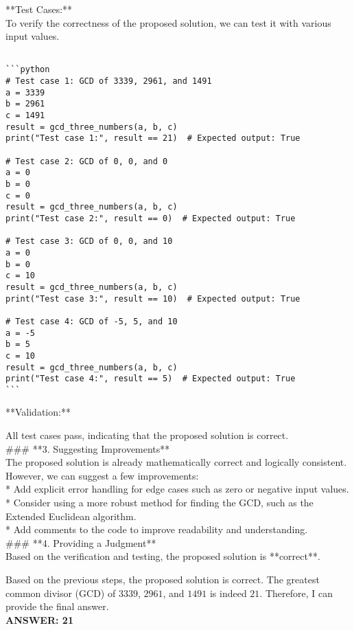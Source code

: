 \begin{tcolorbox}[colback=lightblue, colframe=black, arc=2pt, breakable, title=Examine Answer Tool]
**Test Cases:**\\

To verify the correctness of the proposed solution, we can test it with various input values.\\
\begin{lstlisting}[style=pythonstyle]

```python
# Test case 1: GCD of 3339, 2961, and 1491
a = 3339
b = 2961
c = 1491
result = gcd_three_numbers(a, b, c)
print("Test case 1:", result == 21)  # Expected output: True

# Test case 2: GCD of 0, 0, and 0
a = 0
b = 0
c = 0
result = gcd_three_numbers(a, b, c)
print("Test case 2:", result == 0)  # Expected output: True

# Test case 3: GCD of 0, 0, and 10
a = 0
b = 0
c = 10
result = gcd_three_numbers(a, b, c)
print("Test case 3:", result == 10)  # Expected output: True

# Test case 4: GCD of -5, 5, and 10
a = -5
b = 5
c = 10
result = gcd_three_numbers(a, b, c)
print("Test case 4:", result == 5)  # Expected output: True
```
\end{lstlisting}

**Validation:**

All test cases pass, indicating that the proposed solution is correct.\\

\#\#\# **3. Suggesting Improvements**\\

The proposed solution is already mathematically correct and logically consistent. However, we can suggest a few improvements:\\

* Add explicit error handling for edge cases such as zero or negative input values.\\
* Consider using a more robust method for finding the GCD, such as the Extended Euclidean algorithm.\\
* Add comments to the code to improve readability and understanding.\\

\#\#\# **4. Providing a Judgment**\\

Based on the verification and testing, the proposed solution is **correct**.
\end{tcolorbox}


\begin{tcolorbox}[colback=green!5, colframe=black, arc=2pt, boxrule=0.5pt]
Based on the previous steps, the proposed solution is correct. The greatest common divisor (GCD) of $3339$, $2961$, and $1491$ is indeed $21$. Therefore, I can provide the final answer.\\

\textbf{ANSWER: 21}
\end{tcolorbox}

